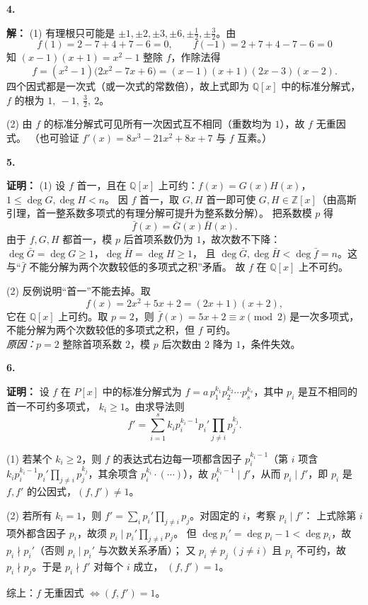 \documentclass[11pt,a4paper,fontset=windows]{ctexart}
\newcommand{\sola}[2]{\Needspace{4\baselineskip}\par\vspace{10pt}%
  \noindent\textbf{#1}\hspace{0.45em}{\small\color{hdgray}\songti #2}\par\vspace{1pt}}
\newcommand{\pf}{\textbf{证明：}}
\newcommand{\sd}{\textbf{解：}}
\begin{document}
\sola{4.}{（10 分）}\sd
(1) 有理根只可能是 $\pm1,\pm2,\pm3,\pm6,\pm\frac12,\pm\frac32$。由
\[
f(1)=2-7+4+7-6=0,\qquad f(-1)=2+7+4-7-6=0
\]
知 $(x-1)(x+1)=x^{2}-1$ 整除 $f$，作除法得
\[
f=(x^{2}-1)\bigl(2x^{2}-7x+6\bigr)=(x-1)(x+1)(2x-3)(x-2).
\]
四个因式都是一次式（或一次式的常数倍），故上式即为 $\mathbb{Q}[x]$ 中的标准分解式，$f$ 的根为
$1,\ -1,\ \frac32,\ 2$。
\par
(2) 由 $f$ 的标准分解式可见所有一次因式互不相同（重数均为 $1$），故 $f$ 无重因式。
（也可验证 $f'(x)=8x^{3}-21x^{2}+8x+7$ 与 $f$ 互素。）

\sola{5.}{（15 分）}\pf
(1) 设 $f$ 首一，且在 $\mathbb{Q}[x]$ 上可约：$f(x)=G(x)H(x)$，$1\le\deg G,\deg H<n$。
因 $f$ 首一，取 $G,H$ 首一即可使 $G,H\in\mathbb{Z}[x]$（由高斯引理，首一整系数多项式的有理分解可提升为整系数分解）。
把系数模 $p$ 得
\[
\bar f(x)=\bar G(x)\bar H(x).
\]
由于 $f,G,H$ 都首一，模 $p$ 后首项系数仍为 $1$，故次数不下降：$\deg\bar G=\deg G\ge1$，$\deg\bar H=\deg H\ge1$，
且 $\deg\bar G,\deg\bar H<\deg\bar f=n$。这与“$\bar f$ 不能分解为两个次数较低的多项式之积”矛盾。
故 $f$ 在 $\mathbb{Q}[x]$ 上不可约。
\par
(2) 反例说明“首一”不能去掉。取
\[
f(x)=2x^{2}+5x+2=(2x+1)(x+2),
\]
它在 $\mathbb{Q}[x]$ 上可约。取 $p=2$，则 $\bar f(x)=5x+2\equiv x\pmod 2$ 是一次多项式，
不能分解为两个次数较低的多项式之积，但 $f$ 可约。
\\[2pt]
\emph{原因：}$p=2$ 整除首项系数 $2$，模 $p$ 后次数由 $2$ 降为 $1$，条件失效。

\sola{6.}{（15 分）}\pf
设 $f$ 在 $P[x]$ 中的标准分解式为 $f=a\,p_1^{k_1}p_2^{k_2}\cdots p_s^{k_s}$，其中 $p_i$ 是互不相同的首一不可约多项式，
$k_i\ge1$。由求导法则
\[
f'=\sum_{i=1}^{s}k_ip_i^{k_i-1}p_i'\prod_{j\neq i}p_j^{k_j}.
\]
\par
(1) 若某个 $k_i\ge2$，则 $f$ 的表达式右边每一项都含因子 $p_i^{k_i-1}$（第 $i$ 项含
$k_ip_i^{k_i-1}p_i'\prod_{j\neq i}p_j^{k_j}$，其余项含 $p_i^{k_i}\cdot(\cdots)$），故
$p_i^{k_i-1}\mid f'$，从而 $p_i\mid f'$，即 $p_i$ 是 $f,f'$ 的公因式，$(f,f')\neq1$。
\par
(2) 若所有 $k_i=1$，则 $f'=\sum_i p_i'\prod_{j\neq i}p_j$。对固定的 $i$，考察 $p_i\mid f'$：
上式除第 $i$ 项外都含因子 $p_i$，故须 $p_i\mid p_i'\prod_{j\neq i}p_j$。
但 $\deg p_i'=\deg p_i-1<\deg p_i$，故 $p_i\nmid p_i'$（否则 $p_i\mid p_i'$ 与次数关系矛盾）；
又 $p_i\neq p_j\ (j\neq i)$ 且 $p_i$ 不可约，故 $p_i\nmid p_j$。于是 $p_i\nmid f'$ 对每个 $i$ 成立，
$(f,f')=1$。
\par
综上：$f$ 无重因式 $\iff (f,f')=1$。
\end{document}
